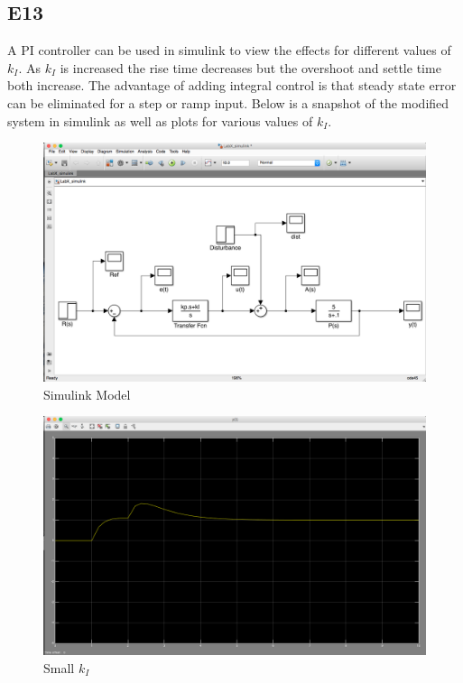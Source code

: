 \documentclass[10pt,titlepage]{article}
\begin{document}
	\subsection*{E13}
	A PI controller can be used in simulink to view the effects for different values of $k_I$. As $k_I$ is increased the rise time decreases but the overshoot and settle time both increase. The advantage of adding integral control is that steady state error can be eliminated for a step or ramp input. Below is a snapshot of the modified system in simulink as well as plots for various values of $k_I$.
	\begin{figure}[H]
		\centering
		\includegraphics[scale=0.3]{e13-1}
		\caption{Simulink Model}
	\end{figure}
	\begin{figure}[H]
		\centering
		\includegraphics[scale=0.3]{e13-2}
		\caption{Small $k_I$}
	\end{figure}
\end{document}
